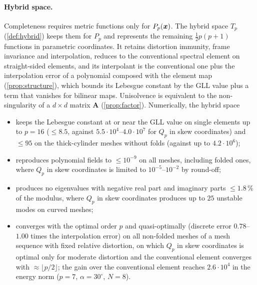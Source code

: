 \paragraph{Hybrid space.} Completeness requires metric functions only for $P_p(\bm{x})$. The hybrid
space $T_p$ (\cref{def:hybrid}) keeps them for $P_p$ and represents the remaining
$\tfrac12p(p+1)$ functions in parametric coordinates. It retains distortion immunity, frame
invariance and interpolation, reduces to the conventional spectral element on straight-sided
elements, and its interpolant is the conventional one plus the interpolation error of a
polynomial composed with the element map (\cref{prop:structure}), which bounds its Lebesgue
constant by the GLL value plus a term that vanishes for bilinear maps. Unisolvence is equivalent
to the non-singularity of a $d\times d$ matrix $\bm A$ (\cref{prop:factor}). Numerically, the hybrid
space
\begin{itemize}
\item keeps the Lebesgue constant at or near the GLL value on single elements up to $p=16$
  ($\le8.5$, against $5.5\cdot10^4$--$4.0\cdot10^7$ for $Q_p$ in skew coordinates) and $\le95$ on the
  thick-cylinder meshes without folds (against up to $4.2\cdot10^6$);
\item reproduces polynomial fields to $\le10^{-9}$ on all meshes, including folded ones, where
  $Q_p$ in skew coordinates is limited to $10^{-5}$--$10^{-2}$ by round-off;
\item produces no eigenvalues with negative real part and imaginary parts $\le1.8\,\%$ of the
  modulus, where $Q_p$ in skew coordinates produces up to $25$ unstable modes on curved meshes;
\item converges with the optimal order $p$ and quasi-optimally (discrete error $0.78$--$1.00$ times
  the interpolation error) on all non-folded meshes of a mesh sequence with fixed relative
  distortion, on which $Q_p$ in skew coordinates is optimal only for moderate distortion and the
  conventional element converges with $\approx\lfloor p/2\rfloor$; the gain over the conventional
  element reaches $2.6\cdot10^4$ in the energy norm ($p=7$, $\alpha=30^\circ$, $N=8$).
\end{itemize}


